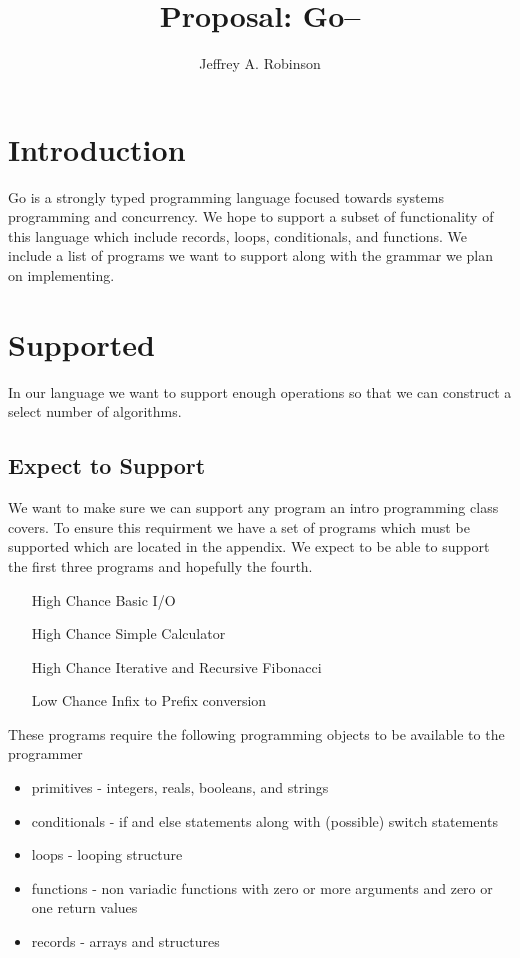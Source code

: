 \documentclass{article}
\title{Proposal: Go--}
\author{Jeffrey A. Robinson}
\begin{document}
\maketitle

\section{Introduction}

Go is a strongly typed programming language focused towards systems programming and concurrency.
We hope to support a subset of functionality of this language which include records, loops, conditionals, and functions.
We include a list of programs we want to support along with the grammar we plan on implementing.  

\section{Supported}

In our language we want to support enough operations so that we can construct a select number of algorithms.

\subsection{Expect to Support}

We want to make sure we can support any program an intro programming class covers.
To ensure this requirment we have a set of programs which must be supported which are located in the appendix.
We expect to be able to support the first three programs and hopefully the fourth.

\begin{itemize}
    \item [High Chance] Basic I/O
    \item [High Chance] Simple Calculator
    \item [High Chance] Iterative and Recursive Fibonacci
    \item [Low Chance] Infix to Prefix conversion
\end{itemize}

These programs require the following programming objects to be available to the programmer

\begin{itemize}
    \item primitives    - integers, reals, booleans, and strings
    \item conditionals  - if and else statements along with (possible) switch statements
    \item loops         - looping structure 
    \item functions     - non variadic functions with zero or more arguments and zero or one return values
    \item records       - arrays and structures
\end{itemize} 
\end{document}

